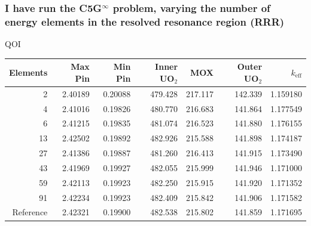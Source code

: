 \documentclass[compress,10pt]{beamer}
\newcommand{\keff}{\ensuremath{{k_\mathrm{eff}}}}
\begin{document}
\begin{frame}
    \frametitle{I have run the C5G$^\infty$ problem, varying the number of energy elements in the resolved resonance region (RRR)}

    \vspace{-3mm}

    \centering

    {\small QOI} \\
    { \scriptsize
    \begin{tabular}{rrrrrrr}
        \hline
        Elements & Max Pin & Min Pin & Inner UO$_2$ & MOX & Outer UO$_2$ & \keff \\ \hline
        \hline
        2 & 2.40189 & 0.20088 & 479.428 & 217.117 & 142.339 & 1.159180 \\ \hline
        4 & 2.41016 & 0.19826 & 480.770 & 216.683 & 141.864 & 1.177549 \\ \hline
        6 & 2.41215 & 0.19835 & 481.074 & 216.523 & 141.880 & 1.176155 \\ \hline
        13 & 2.42502 & 0.19892 & 482.926 & 215.588 & 141.898 & 1.174187 \\ \hline
        27 & 2.41386 & 0.19887 & 481.260 & 216.413 & 141.915 & 1.173490 \\ \hline
        43 & 2.41969 & 0.19927 & 482.055 & 215.999 & 141.946 & 1.171000 \\ \hline
        59 & 2.42113 & 0.19923 & 482.250 & 215.915 & 141.920 & 1.171352 \\ \hline
        91 & 2.42234 & 0.19923 & 482.409 & 215.842 & 141.906 & 1.171582 \\ \hline
        Reference & 2.42321 & 0.19900 & 482.538 & 215.802 & 141.859 & 1.171695 \\ \hline
    \end{tabular}
    }

    \vspace{2mm}


\end{frame}
\end{document}
